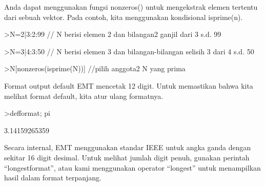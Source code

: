 \documentclass[a4paper,10pt]{article}
\begin{document}
\begin{eulernotebook}
\begin{eulercomment}
Anda dapat menggunakan fungsi nonzeros() untuk mengekstrak elemen
tertentu dari sebuah vektor. Pada contoh, kita menggunakan kondisional
isprime(n).
\end{eulercomment}
\begin{eulerprompt}
>N=2|3:2:99 // N berisi elemen 2 dan bilangan2 ganjil dari 3 s.d. 99
\end{eulerprompt}
\begin{euleroutput}
  [2,  3,  5,  7,  9,  11,  13,  15,  17,  19,  21,  23,  25,  27,  29,
  31,  33,  35,  37,  39,  41,  43,  45,  47,  49,  51,  53,  55,  57,
  59,  61,  63,  65,  67,  69,  71,  73,  75,  77,  79,  81,  83,  85,
  87,  89,  91,  93,  95,  97,  99]
\end{euleroutput}
\begin{eulerprompt}
>N=3|4:3:50 // N berisi elemen 3 dan bilangan-bilangan selisih 3 dari 4 s.d. 50
\end{eulerprompt}
\begin{euleroutput}
  [3,  4,  7,  10,  13,  16,  19,  22,  25,  28,  31,  34,  37,  40,  43,
  46,  49]
\end{euleroutput}
\begin{eulerprompt}
>N[nonzeros(isprime(N))] //pilih anggota2 N yang prima
\end{eulerprompt}
\begin{euleroutput}
  [2,  3,  5,  7,  11,  13,  17,  19,  23,  29,  31,  37,  41,  43,  47,
  53,  59,  61,  67,  71,  73,  79,  83,  89,  97]
\end{euleroutput}
\begin{eulercomment}
Format output default EMT mencetak 12 digit. Untuk memastikan bahwa
kita melihat format default, kita atur ulang formatnya.
\end{eulercomment}
\begin{eulerprompt}
>defformat; pi
\end{eulerprompt}
\begin{euleroutput}
  3.14159265359
\end{euleroutput}
\begin{eulercomment}
Secara internal, EMT menggunakan standar IEEE untuk angka ganda dengan
sekitar 16 digit desimal. Untuk melihat jumlah digit penuh, gunakan
perintah “longestformat”, atau kami menggunakan operator “longest”
untuk menampilkan hasil dalam format terpanjang.
\end{eulercomment}
\begin{eulerprompt}

\end{eulerprompt}
\end{eulernotebook}
\end{document}
